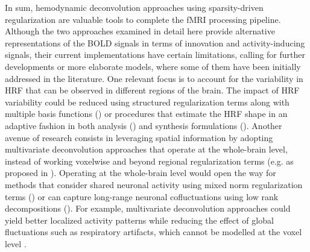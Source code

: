 In sum, hemodynamic deconvolution approaches using sparsity-driven regularization are valuable tools to complete the fMRI processing pipeline. Although the two approaches examined in detail here provide alternative representations of the BOLD signals in terms of innovation and activity-inducing signals, their current implementations have certain limitations, calling for further developments or more elaborate models, where some of them have been initially addressed in the literature. One relevant focus is to account for the variability in HRF that can be observed in different regions of the brain. The impact of HRF variability could be reduced using structured regularization terms along with multiple basis functions (\citealt{Gaudes2012Structuredsparsedeconvolution}) or procedures that estimate the HRF shape in an adaptive fashion in both analysis (\citealt{Farouj2019BoldSignalDeconvolution}) and synthesis formulations (\citealt{cherkaoui:hal-03005584}). Another avenue of research consists in leveraging spatial information by adopting multivariate deconvolution approaches that operate at the whole-brain level, instead of working voxelwise and beyond regional regularization terms (e.g. as proposed in  \citealt{Karahanoglu2013TotalactivationfMRI}).  Operating at the whole-brain level would open the way for methods that consider shared neuronal activity using mixed norm regularization terms (\citealt{urunuela-tremino_2019}) or can capture long-range neuronal cofluctuations using low rank decompositions (\citealt{cherkaoui:hal-03005584}). For example, multivariate deconvolution approaches could yield better localized activity patterns while reducing the effect of global fluctuations such as respiratory artifacts, which cannot be modelled at the voxel level \citealt{Urunuela_2021}. 

